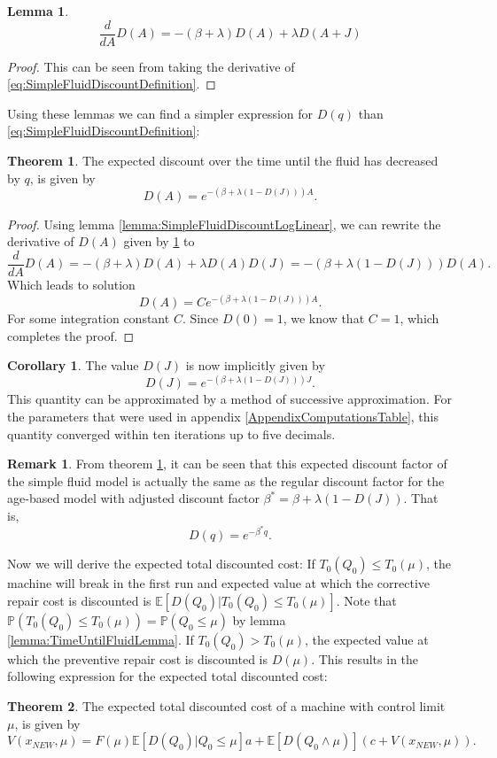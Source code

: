 \documentclass[a4paper]{thesis}
\theoremstyle{definition}
\newtheorem{remark}{Remark}[chapter]
\newtheorem{corollary}{Corollary}[chapter]
\newtheorem{theorem}{Theorem}[section]
\newtheorem{lemma}{Lemma}
\begin{document}
\begin{lemma}\label{lemma:SimpleFluidDiscountODE}
	$$\frac{d}{dA}D(A)=-(\beta+\lambda)D(A)+\lambda D(A+J)$$
	\begin{proof}
		This can be seen from taking the derivative of \eqref{eq:SimpleFluidDiscountDefinition}.
	\end{proof}
\end{lemma}
Using these lemmas we can find a simpler expression for $D(q)$ than \eqref{eq:SimpleFluidDiscountDefinition}:
\begin{theorem}\label{theorem:SimpleFluidDiscountExpression}
	The expected discount over the time until the fluid has decreased by $q$, is given by
	\[
	D(A)=e^{-(\beta+\lambda(1-D(J)))A}.
	\]
	\begin{proof}
		Using lemma \ref{lemma:SimpleFluidDiscountLogLinear}, we can rewrite the derivative of $D(A)$ given by \ref{lemma:SimpleFluidDiscountODE} to
		\[
		\frac{d}{dA}D(A)=-(\beta+\lambda)D(A)+\lambda D(A)D(J)=-(\beta+\lambda(1-D(J)))D(A).
		\]
		Which leads to solution
		\[
		D(A)=Ce^{-(\beta+\lambda(1-D(J)))A}.
		\]
		For some integration constant $C$. Since $D(0)=1$, we know that $C=1$, which completes the proof.
	\end{proof}
\end{theorem}
\begin{corollary}
	The value $D(J)$ is now implicitly given by
	\[
	D(J)=e^{-(\beta+\lambda(1-D(J)))J}.
	\]
	This quantity can be approximated by a method of successive approximation.
	For the parameters that were used in appendix \ref{AppendixComputationsTable}, this quantity converged within ten iterations up to five decimals.
\end{corollary}
\begin{remark}\label{remark:SimpleFluidDiscountEquivalence}
	From theorem \ref{theorem:SimpleFluidDiscountExpression}, it can be seen that this expected discount factor of the simple fluid model is actually the same as the regular discount factor for the age-based model with adjusted discount factor $\beta^*=\beta+\lambda(1-D(J))$.
	That is,
	\[
	D(q)=e^{-\beta^*q}.
	\]
\end{remark}

Now we will derive the expected total discounted cost:
If $T_0(Q_0)\leq T_0(\mu)$, the machine will break in the first run and expected value at which the corrective repair cost is discounted is $\mathbb{E}[D(Q_0)|T_0(Q_0)\leq T_0(\mu)]$.
Note that $\mathbb{P}(T_0(Q_0)\leq T_0(\mu))=\mathbb{P}(Q_0\leq\mu)$ by lemma \ref{lemma:TimeUntilFluidLemma}.
If $T_0(Q_0)> T_0(\mu)$, the expected value at which the preventive repair cost is discounted is $D(\mu)$.
This results in the following expression for the expected total discounted cost:
\begin{theorem}
	The expected total discounted cost of a machine with control limit $\mu$, is given by
	\begin{equation}\label{eq:SimpleFluidImplicitTDC}
	V(x_{NEW},\mu)=F(\mu)\mathbb{E}[D(Q_0)|Q_0\leq \mu]a+\mathbb{E}[D(Q_0\wedge\mu)](c+V(x_{NEW},\mu)).
	\end{equation}
\end{theorem}
\end{document}
